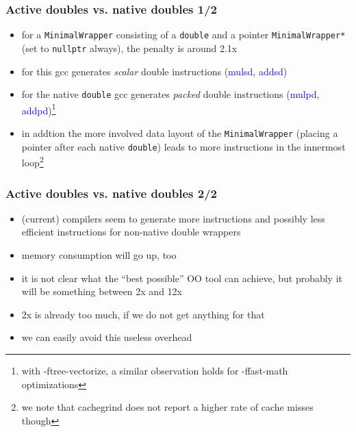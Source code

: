 \documentclass[10pt,German]{beamer}
\begin{document}
\begin{frame}[fragile]
\frametitle{Active doubles vs. native doubles 1/2}
\begin{itemize}
\item for a \verb+MinimalWrapper+ consisting of a \verb+double+ and a pointer \verb+MinimalWrapper*+ (set to \verb+nullptr+ always), the penalty is around 2.1x
\item for this gcc generates \textit{scalar} double instructions (\textcolor{blue}{mulsd}, \textcolor{blue}{addsd})
\item for the native \verb+double+ gcc generates \textit{packed} double instructions (\textcolor{blue}{mulpd}, \textcolor{blue}{addpd})\footnote{with -ftree-vectorize, a similar observation holds for -ffast-math optimizations}
\item in addtion the more involved data layout of the \verb+MinimalWrapper+ (placing a pointer after each native \verb+double+) leads to more instructions in the innermost loop\footnote{we note that cachegrind does not report a higher rate of cache misses though}
\end{itemize}
\end{frame}

\begin{frame}[fragile]
\frametitle{Active doubles vs. native doubles 2/2}
\begin{itemize}
\item (current) compilers seem to generate more instructions and possibly less efficient instructions for non-native double wrappers
\item memory consumption will go up, too
\item it is not clear what the ``best possible'' OO tool can achieve, but probably it will be something between 2x and 12x
\item 2x is already too much, if we do not get anything for that
\item we can easily avoid this useless overhead
\end{itemize}
\end{frame}
\end{document}
